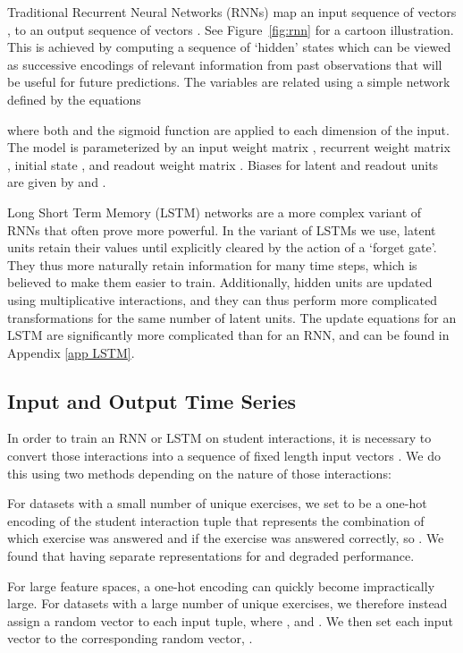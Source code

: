 \documentclass{article} \usepackage{nips,times}
\begin{document}
Traditional Recurrent Neural Networks (RNNs) map an input sequence of vectors , to an output sequence of vectors . See Figure~\ref{fig:rnn} for a cartoon illustration. This is achieved by computing a sequence of `hidden' states   which can be viewed as successive encodings of relevant information from past observations that will be useful for future predictions. The variables are related using a simple network defined by the equations

where both  and the sigmoid function  are applied to each dimension of the input.
The model is parameterized by an input weight matrix , recurrent weight matrix , initial state , and readout weight matrix .
Biases for latent and readout units are given by  and .


Long Short Term Memory (LSTM) networks \cite{hochreiter1997long} are a more complex variant of RNNs that often prove more powerful.
In the variant of LSTMs we use, latent units retain their values until explicitly cleared by the action of a `forget gate'.
They thus more naturally retain information for many time steps, which is believed to make them easier to train.
Additionally, hidden units are updated using multiplicative interactions, and they can thus perform more complicated transformations for the same number of latent units.
The update equations for an LSTM are significantly more complicated than for an RNN, and can be found in Appendix \ref{app LSTM}.


\subsection{Input and Output Time Series}

In order to train an RNN or LSTM on student interactions, it is necessary to convert those interactions into a sequence of fixed length input vectors .
We do this using two methods depending on the nature of those interactions:



For datasets with a small number  of unique exercises, we set  to be a one-hot encoding of the student interaction tuple  that represents the combination of which exercise was answered and if the exercise was answered correctly, so . We found that having separate representations for  and  degraded performance.

For large feature spaces, a one-hot encoding can quickly become impractically large.
For datasets with a large number of unique exercises, we therefore instead assign a random vector  to each input tuple, where , and . We then set each input vector  to the corresponding random vector, .
\end{document}
